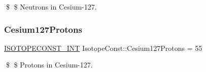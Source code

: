 \$ \$ Neutrons in Cesium-\/127. \mbox{\label{group___isotope_const-_cesium-_cs127_gac6c5251168c9599e5804169b5c0e67e1}} 
\subsubsection{\texorpdfstring{Cesium127\+Protons}{Cesium127Protons}}
{\footnotesize\ttfamily \mbox{\hyperlink{group___isotope_const-_macros_ga5f18360b3e99483a35c32d789e62621c}{I\+S\+O\+T\+O\+P\+E\+C\+O\+N\+S\+T\+\_\+\+I\+NT}} Isotope\+Const\+::\+Cesium127\+Protons = 55}

\$ \$ Protons in Cesium-\/127. 